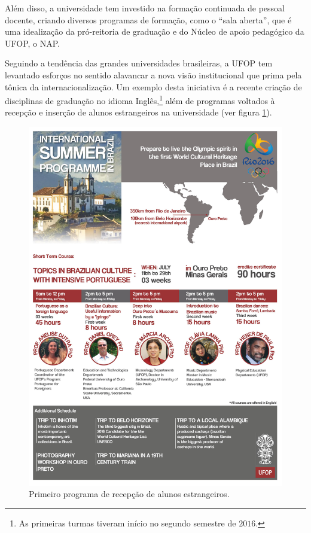 Além disso, a universidade tem investido na formação continuada de pessoal docente, criando diversos programas de formação, como o ``sala aberta'', que é uma idealização da pró-reitoria de graduação e do Núcleo de apoio pedagógico da UFOP, o NAP.

Seguindo a tendência das grandes universidades brasileiras, a UFOP tem levantado esforços no sentido alavancar a nova visão institucional \cite{resolucao-cuni-1} que prima pela tônica da internacionalização. Um exemplo desta iniciativa é a recente criação de disciplinas de graduação no idioma Inglês,\footnote{As primeiras turmas tiveram início no segundo semestre de $2016$.} além de programas voltados à recepção e inserção de alunos estrangeiros na universidade (ver figura \ref{fig:01}).
%
\begin{figure}[!bpt]
	\centering
	\includegraphics[scale=0.5]{figuras/Summer_Course1.jpg}
	\caption{Primeiro programa de recepção de alunos estrangeiros.}
	\label{fig:01}
\end{figure}
%
